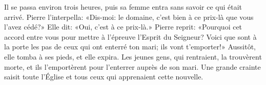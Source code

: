 Il se passa environ trois heures,
	puis sa femme entra sans savoir ce qui était arrivé.
Pierre l’interpella: «Dis-moi:
	le domaine, c’est bien à ce prix-là que vous l’avez cédé?»
	Elle dit: «Oui, c’est à ce prix-là.»
Pierre reprit: «Pourquoi cet accord entre vous
	pour mettre à l’épreuve l’Esprit du Seigneur?
	Voici que sont à la porte les pas de ceux qui ont enterré ton mari;
	ils vont t’emporter!»
Aussitôt, elle tomba à ses pieds, et elle expira.
Les jeunes gens, qui rentraient, la trouvèrent morte,
	et ils l’emportèrent pour l’enterrer auprès de son mari.
Une grande crainte saisit toute l’Église
	et tous ceux qui apprenaient cette nouvelle.
